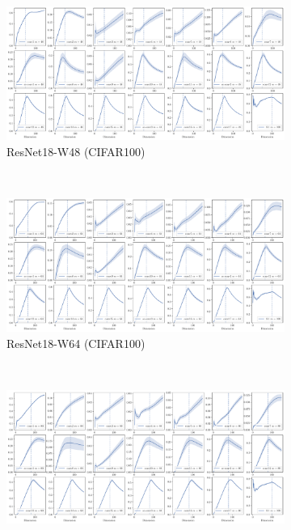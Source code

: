 \begin{figure}[H]
    \centering
    \begin{subfigure}[b]{\textwidth}
        \centering
        \captionsetup{justification=centering}
        \includegraphics[width=\textwidth]{Appendix_Figures/Overlap_large_model/overlap_raw/ResNet/Resnet18W48New_nobn_fixlr0.01_appendix_vertical_7col.pdf}
        \caption{ResNet18-W48 (CIFAR100)}
        \label{fig:app_adexp_cifar100_resnet48}
    \end{subfigure}%
    \\
    \begin{subfigure}[b]{\textwidth}
        \centering
        \captionsetup{justification=centering}
        \includegraphics[width=\textwidth]{Appendix_Figures/Overlap_large_model/overlap_raw/ResNet/Resnet18W64New_nobn_fixlr0.01_appendix_vertical_7col.pdf}
        \caption{ResNet18-W64 (CIFAR100)}
        \label{fig:app_adexp_cifar100_resnet64}
    \end{subfigure}
    \\
    \begin{subfigure}[b]{\textwidth}
        \centering
        \captionsetup{justification=centering}
        \includegraphics[width=\textwidth]{Appendix_Figures/Overlap_large_model/overlap_raw/ResNet/Resnet18W80_nobn_fixlr0.01_appendix_vertical_7col.pdf}

\end{subfigure}
\end{figure}
